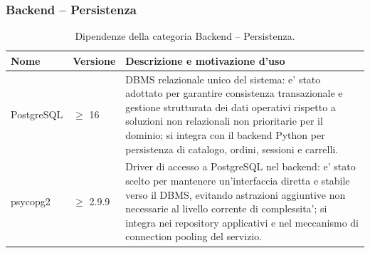\documentclass[a4paper, 11pt, oneside]{scrartcl}
\begin{document}
\subsubsection{Backend -- Persistenza}
\begin{table}[H]
    \centering
    \renewcommand{\arraystretch}{1.2}
    \begin{tabularx}{\textwidth}{@{}l l X@{}}
        \toprule
        \textbf{Nome} & \textbf{Versione} & \textbf{Descrizione e motivazione d'uso} \\
        \midrule
        PostgreSQL & $\geq$ 16 & DBMS relazionale unico del sistema: e' stato adottato per garantire consistenza transazionale e gestione strutturata dei dati operativi rispetto a soluzioni non relazionali non prioritarie per il dominio; si integra con il backend Python per persistenza di catalogo, ordini, sessioni e carrelli. \\
        psycopg2 & $\geq$ 2.9.9 & Driver di accesso a PostgreSQL nel backend: e' stato scelto per mantenere un'interfaccia diretta e stabile verso il DBMS, evitando astrazioni aggiuntive non necessarie al livello corrente di complessita'; si integra nei repository applicativi e nel meccanismo di connection pooling del servizio. \\
        \bottomrule
    \end{tabularx}
    \caption{Dipendenze della categoria Backend -- Persistenza.}
    \label{tab:dip_backend_persistenza}
\end{table}
\end{document}
